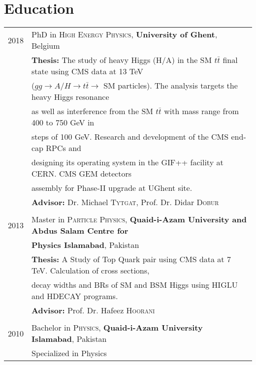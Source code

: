 \documentclass[a4paper,10pt]{article}
\begin{document}
\section{Education}
\begin{tabular}{rl}	
2018 & PhD in \textsc{High Energy Physics}, \small \textbf{University of Ghent}, Belgium\\
&\textbf{Thesis:} \small The study of heavy Higgs (H/A) in the SM $t\bar{t}$ final state using CMS data at 13 TeV\\
& ($gg\rightarrow A/H\rightarrow t\bar t \rightarrow$ SM particles). The analysis targets the heavy Higgs resonance \\
& as well as interference from the SM $t\bar t$ with mass range from 400 to 750 GeV in\\
& steps of 100 GeV. Research and development of the CMS end-cap RPCs and\\
& designing its operating system in the GIF++ facility at CERN. CMS GEM detectors\\
& assembly for Phase-II upgrade at UGhent site.\\
& \textbf{Advisor:} Dr. Michael \textsc{Tytgat}, Prof. Dr. Didar \textsc{Dobur}
\\&\\
2013 & Master in \textsc{Particle Physics}, \small \textbf{Quaid-i-Azam University and Abdus Salam Centre for}\\
& \small \textbf{Physics Islamabad}, Pakistan\\
& \textbf{Thesis:} \small A Study of Top Quark pair using CMS data at 7 TeV. Calculation of cross sections,\\
& decay widths and BRs of SM and BSM Higgs using HIGLU and HDECAY programs.\\
&\textbf{Advisor:} Prof. Dr. Hafeez \textsc{Hoorani}
\\&\\
2010 & Bachelor in \textsc{Physics}, \small \textbf{Quaid-i-Azam University Islamabad}, Pakistan\\
& Specialized in Physics\\
\end{tabular}
\end{document}
